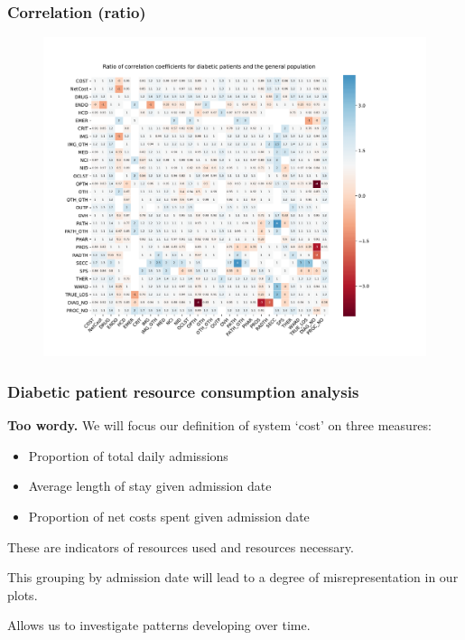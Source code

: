 \documentclass{beamer}
\begin{document}
\begin{frame}
    \frametitle{Correlation (ratio)}

    \vspace{-15pt}
    \begin{figure}
    \includegraphics[width=\linewidth]{./img/ratio_corr_heatmap.pdf}
    \end{figure}
\end{frame}

\begin{frame}
    \frametitle{Diabetic patient resource consumption analysis}
    \textbf{Too wordy.}
    We will focus our definition of system `cost' on three measures:

    \pause%
    \begin{itemize}
        \item Proportion of total daily admissions
        \item Average length of stay given admission date
        \item Proportion of net costs spent given admission date
    \end{itemize}

    \pause%
    \vspace{10pt}
    These are indicators of resources used and resources necessary.

    \vspace{10pt}
    This grouping by admission date will lead to a degree of misrepresentation
    in our plots.

    \vspace{10pt}
    Allows us to investigate patterns developing over time.
\end{frame}
\end{document}
